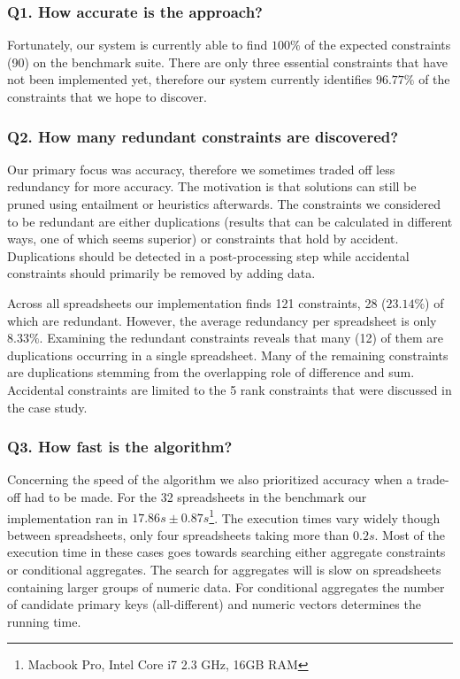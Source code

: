 \documentclass{ecai}
\begin{document}
\subsubsection*{Q1. How accurate is the approach?}
Fortunately, our system is currently able to find $100\%$ of the expected constraints (90) on the benchmark suite.
There are only three essential constraints that have not been implemented yet, therefore our system currently identifies $96.77\%$ of the constraints that we hope to discover.

\subsubsection*{Q2. How many redundant constraints are discovered?}
Our primary focus was accuracy, therefore we sometimes traded off less redundancy for more accuracy.
The motivation is that solutions can still be pruned using entailment or heuristics afterwards.
The constraints we considered to be redundant are either duplications (results that can be calculated in different ways, one of which seems superior) or constraints that hold by accident.
Duplications should be detected in a post-processing step while accidental constraints should primarily be removed by adding data.

Across all spreadsheets our implementation finds 121 constraints, 28 ($23.14\%$) of which are redundant.
However, the average redundancy per spreadsheet is only $8.33\%$.
Examining the redundant constraints reveals that many (12) of them are duplications occurring in a single spreadsheet.
Many of the remaining constraints are duplications stemming from the overlapping role of difference and sum.
Accidental constraints are limited to the 5 rank constraints that were discussed in the case study.

\subsubsection*{Q3. How fast is the algorithm?}
Concerning the speed of the algorithm we also prioritized accuracy when a trade-off had to be made.
For the 32 spreadsheets in the benchmark our implementation ran in $17.86s \pm 0.87s$\footnote{Macbook Pro, Intel Core i7 2.3 GHz, 16GB RAM}.
The execution times vary widely though between spreadsheets, only four spreadsheets taking more than $0.2s$.
Most of the execution time in these cases goes towards searching either aggregate constraints or conditional aggregates.
The search for aggregates will is slow on spreadsheets containing larger groups of numeric data.
For conditional aggregates the number of candidate primary keys (all-different) and numeric vectors determines the running time.
\end{document}
